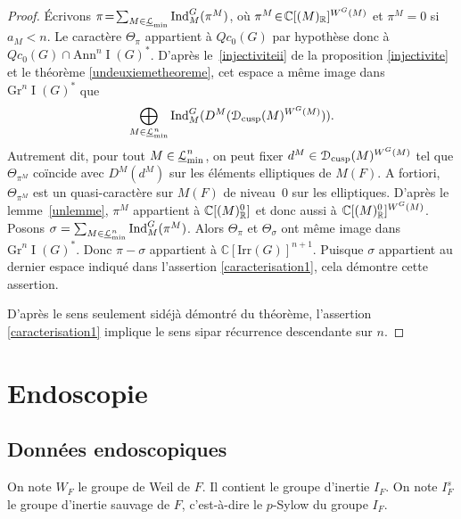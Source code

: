 \documentclass[11pt]{article}
\numberwithin{equation}{section}\providecommand{\og}{«\,}\providecommand{\fg}{\,»}
\let\mathcal \EuScript
\newcommand{\NoChangel}[1]{%
\expandafter\let\csname old\string#1\endcsname=#1
\let#1=\relax
\newcommand{#1}{\mathcode`l="716C\csname old\string#1\endcsname\mathcode`l="7160 }%
}
\newcommand{\Ann}{\mathrm{Ann}}
\newcommand{\cusp}{\mathrm{cusp}}
\newcommand{\Ell}{\mathrm{Ell}} \NoChangel{\Ell}
\newcommand{\Gr}{\mathrm{Gr}}
\newcommand{\Ind}{\mathrm{Ind}}
\newcommand{\Irr}{\mathrm{Irr}}
\DeclareMathOperator{\rI}{I}
\newcommand{\cD}{\mathcal{D}}
\newcommand{\cL}{\mathcal{L}}
\newcommand{\CC}{\mathbb{C}}
\newcommand{\RR}{\mathbb{R}}
\theoremstyle{plain}
\theoremstyle{definition}
\begin{document}
\begin{proof}
Écrivons $\pi\!=\!\sum_{M\in \underline{\cL}_{\min}}\Ind_{M}^G(\pi^M)$, où $\pi^M\!\in\!\CC[\Ell(M)_{\RR}]^{W^G(M)}$ et $\pi^M\!=\!0$ si $a_{M}\!<\!n$. Le caractère $\Theta_{\pi}$ appartient à $Qc_{0}(G)$ par hypothèse donc à $Qc_{0}(G)\cap \Ann^n\rI(G)^*$. D'après le~\eqref{injectiviteii} de la proposition \ref{injectivite} et le théorème \ref{undeuxiemetheoreme}, cet espace a même image dans $\Gr^n\rI(G)^*$ que
\[
\bigoplus_{M\in \underline{\cL}^n_{\min}}\Ind_{M}^G(D^M(\cD_{\cusp}(M)^{W^G(M)})).
\]
Autrement dit, pour tout $M\in \underline{\cL}^n_{\min}$, on peut fixer $d^M\in \cD_{\cusp}(M)^{W^G(M)}$ tel que $\Theta_{\pi^M}$ coïncide avec $D^M(d^M)$ sur les éléments elliptiques de $M(F)$. A fortiori, $\Theta_{\pi^M}$ est un quasi-caractère sur $M(F)$ de niveau~$0$ sur les elliptiques. D'après le lemme~\ref{unlemme}, $\pi^M$ appartient à $\CC[\Ell(M)_{\RR}^0]$ et donc aussi à $\CC[\Ell(M)_{\RR}^0]^{W^G(M)}$. Posons
$\sigma=\sum_{M\in \underline{\cL}^n_{\min}}\Ind_{M}^G(\pi^M)$. Alors $\Theta_{\pi}$ et $\Theta_{\sigma}$ ont même image dans $\Gr^n\rI(G)^*$. Donc $\pi-\sigma$ appartient à $\CC[\Irr(G)]^{n+1}$. Puisque $\sigma$ appartient au dernier espace indiqué dans l'assertion \eqref{caracterisation1}, cela démontre cette assertion.

D'après le sens \og seulement si\fg déjà démontré du théorème, l'assertion \eqref{caracterisation1} implique le sens \og si\fg par récurrence descendante sur $n$.
\end{proof}

\section{Endoscopie}

\subsection{Données endoscopiques}\label{donneesendoscopiques}
On note $W_{F}$ le groupe de Weil de $F$. Il contient le groupe d'inertie $I_{F}$. On note $I_{F}^s$ le groupe d'inertie sauvage de $F$, c'est-à-dire le $p$-Sylow du groupe $I_{F}$.
\end{document}
